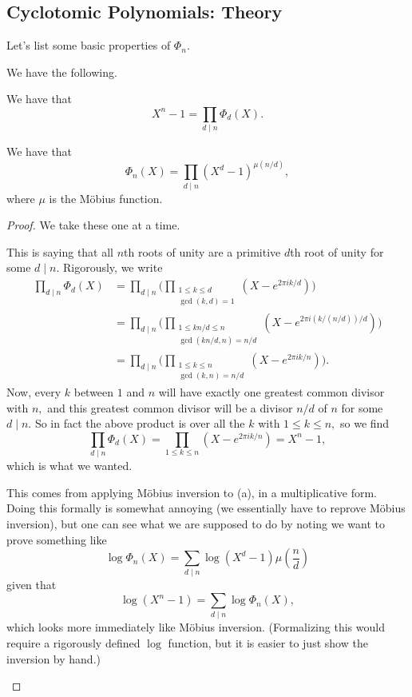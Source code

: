 \documentclass[../notes.tex]{subfiles}
\begin{document}
\subsection{Cyclotomic Polynomials: Theory}
Let's list some basic properties of $\Phi_n.$
\begin{proposition}
	We have the following.
	\begin{listalph}
		\item We have that
		\[X^n-1=\prod_{d\mid n}\Phi_d(X).\]
		\item We have that
		\[\Phi_n(X)=\prod_{d\mid n}\left(X^d-1\right)^{\mu(n/d)},\]
		where $\mu$ is the M\"obius function.
	\end{listalph}
\end{proposition}
\begin{proof}
	We take these one at a time.
	\begin{listalph}
		\item This is saying that all $n$th roots of unity are a primitive $d$th root of unity for some $d\mid n.$ Rigorously, we write
		\begin{align*}
			\prod_{d\mid n}\Phi_d(X) &= \prod_{d\mid n}\bigg(\prod_{\substack{1\le k\le d\\\gcd(k,d)=1}}\left(X-e^{2\pi ik/d}\right)\bigg) \\
			&= \prod_{d\mid n}\bigg(\prod_{\substack{1\le kn/d\le n\\\gcd(kn/d,n)=n/d}}\left(X-e^{2\pi i(k/(n/d))/d}\right)\bigg) \\
			&= \prod_{d\mid n}\bigg(\prod_{\substack{1\le k\le n\\\gcd(k,n)=n/d}}\left(X-e^{2\pi ik/n}\right)\bigg).
		\end{align*}
		Now, every $k$ between $1$ and $n$ will have exactly one greatest common divisor with $n,$ and this greatest common divisor will be a divisor $n/d$ of $n$ for some $d\mid n.$ So in fact the above product is over all the $k$ with $1\le k\le n,$ so we find
		\[\prod_{d\mid n}\Phi_d(X)=\prod_{1\le k\le n}\left(X-e^{2\pi ik/n}\right)=X^n-1,\]
		which is what we wanted.
		\item This comes from applying M\"obius inversion to (a), in a multiplicative form. Doing this formally is somewhat annoying (we essentially have to reprove M\"obius inversion), but one can see what we are supposed to do by noting we want to prove something like
		\[\log\Phi_n(X)=\sum_{d\mid n}\log\left(X^d-1\right)\mu\left(\frac nd\right)\]
		given that
		\[\log\left(X^n-1\right)=\sum_{d\mid n}\log\Phi_n(X),\]
		which looks more immediately like M\"obius inversion. (Formalizing this would require a rigorously defined $\log$ function, but it is easier to just show the inversion by hand.)
		\qedhere
	\end{listalph}
\end{proof}
\end{document}
